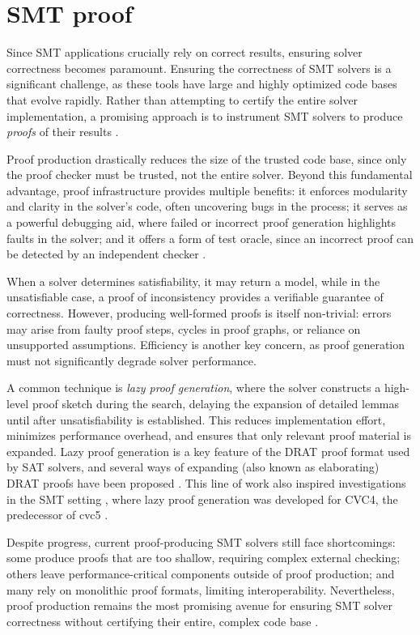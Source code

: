 \section{SMT proof}
\label{sec:smt-proof}

Since SMT applications crucially rely on correct results, ensuring solver correctness becomes paramount.
Ensuring the correctness of SMT solvers is a significant challenge, as these tools have large and highly optimized code bases that evolve rapidly. 
Rather than attempting to certify the entire solver implementation, a promising approach is to instrument SMT solvers to produce \emph{proofs} of their results \cite{proof-smt}.

Proof production drastically reduces the size of the trusted code base, since only the proof checker must be trusted, not the entire solver.
Beyond this fundamental advantage, proof infrastructure provides multiple benefits:  it enforces modularity and clarity in the solver’s code, often uncovering bugs in the process;
it serves as a powerful debugging aid, where failed or incorrect proof generation highlights faults in the solver;
and it offers a form of test oracle, since an incorrect proof can be detected  by an independent checker \cite{10.1007/978-3-319-66107-0_18}. 

When a solver determines satisfiability, it may return a model, while in the unsatisfiable case,  a proof of inconsistency provides a verifiable guarantee of correctness. 
However, producing well-formed proofs is itself non-trivial: errors may arise from faulty proof steps, cycles in proof graphs, or reliance on unsupported assumptions. 
Efficiency is another key concern, as proof generation must not significantly  degrade solver performance. 

A common technique is \emph{lazy proof generation}, where the solver constructs a high-level proof sketch  during the search, delaying the expansion of detailed lemmas until after unsatisfiability is established. 
This reduces implementation effort, minimizes performance overhead, and ensures that only  relevant proof material is expanded.
Lazy proof generation is a key feature of the DRAT \cite{drat} proof format used by SAT solvers, and several ways of expanding (also known as elaborating) DRAT proofs have been proposed \cite{10.1007/978-3-319-63046-5_14,DBLP:conf/cade/KieslRH18, 10.1007/978-3-319-63046-5_15}.
This line of work also inspired investigations in the SMT setting \cite{lazy-proof-smt}, where lazy proof generation was developed for CVC4, the predecessor of cvc5 \cite{cvc4}.

Despite progress, current proof-producing SMT solvers still face shortcomings:  some produce proofs that are too shallow, requiring complex external checking; 
others leave performance-critical components outside of proof production; 
and many rely on monolithic proof formats, limiting interoperability. 
Nevertheless, proof production remains the most promising avenue for ensuring SMT solver correctness  without certifying their entire, complex code base \cite{LFSC}.
